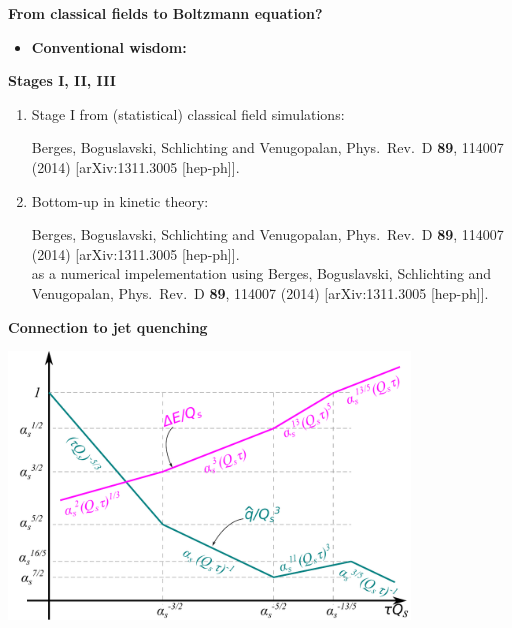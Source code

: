 \documentclass[9pt,a4paper,unknownkeysallowed,xcolor=dvipsnames,aspectratio=43]{beamer}
\begin{document}
%
%
\begin{frame}{\bf\huge From classical fields to Boltzmann equation?}	\vspace{2mm}
\begin{itemize}
    \item {\large {\bf Conventional wisdom:} }
\end{itemize}
\end{frame}
%
%
\begin{frame}{\bf\huge Stages I, II, III}	\vspace{2mm}
\begin{enumerate}
    \item {\large Stage I from (statistical) classical field simulations:}
\begin{center}
    {\tiny  {\color{teablue}
  Berges, Boguslavski, Schlichting and Venugopalan,
  Phys.\ Rev.\ D {\bf 89}, 114007 (2014)
  [arXiv:1311.3005 [hep-ph]].
}}
\end{center}
    \item {\large Bottom-up in kinetic theory:}
\begin{center}
    {\tiny  {\color{teablue}
  Berges, Boguslavski, Schlichting and Venugopalan,
  Phys.\ Rev.\ D {\bf 89}, 114007 (2014)
  [arXiv:1311.3005 [hep-ph]].
}\\
as a numerical impelementation using
{\color{teablue}
  Berges, Boguslavski, Schlichting and Venugopalan,
  Phys.\ Rev.\ D {\bf 89}, 114007 (2014)
  [arXiv:1311.3005 [hep-ph]].
}}
\end{center} 
\end{enumerate}
\end{frame}
%
%
\begin{frame}{\bf\huge Connection to jet quenching}	\vspace{2mm}
\begin{center}
\includegraphics[width=0.8\textwidth]{fig/qhatInBottomUp}
\end{center}
\end{frame}
\end{document}
